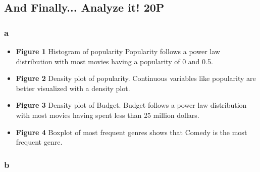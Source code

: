 \documentclass[a4paper]{article}
\begin{document}
	\subsection{And Finally... Analyze it! 20P}
	
	\subsubsection{a}
	
	\begin{itemize}
		\item \textbf{Figure 1} Histogram of popularity
		Popularity follows a power law distribution with most movies having a popularity of 0 and 0.5.
		
		\item \textbf{Figure 2}
		Density plot of popularity.
		Continuous variables like popularity are better visualized with a density plot.
		
		\item \textbf{Figure 3} 
		Density plot of Budget.
		Budget follows a power law distribution with most movies having spent less than 25 million dollars.
		
		\item \textbf{Figure 4}
		Boxplot of most frequent genres shows that Comedy is the most frequent genre.
	\end{itemize}
	
	
	
	\subsubsection{b}
	
\end{document}
